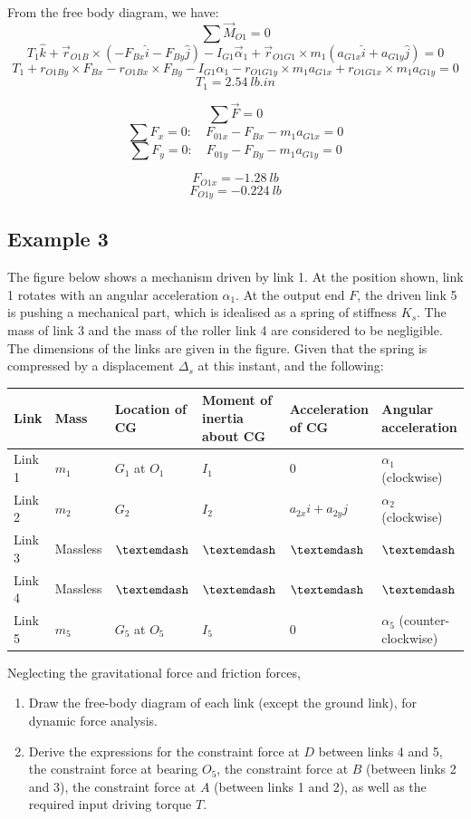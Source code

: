 \documentclass[11pt]{article}
\begin{document}
From the free body diagram, we have:
\[\sum \vec{M}_{O1} = 0\]
\[T_1 \hat{k} + \vec{r}_{O1B} \times (- F_{Bx} \hat{i} - F_{By} \hat{j}) - I_{G1} \vec{\alpha}_1 + \vec{r}_{O1G1} \times m_1 (a_{G1x} \hat{i} + a_{G1y} \hat{j}) = 0\]
\[T_1 + r_{O1By} \times F_{Bx} - r_{O1Bx} \times F_{By} - I_{G1} \alpha_1 - r_{O1G1y} \times m_1 a_{G1x} + r_{O1G1x} \times m_1 a_{G1y} = 0\]
\[T_1 = \qty{2.54}{lb.in}\]

\[\sum \vec{F} = 0\]
\[\sum F_x = 0: \quad F_{01x} - F_{Bx} - m_1 a_{G1x} = 0\]
\[\sum F_y = 0: \quad F_{01y} - F_{By} - m_1 a_{G1y} = 0\]

\[F_{O1x} = \qty{-1.28}{lb}\]
\[F_{O1y} = \qty{-0.224}{lb}\]
\subsection{Example 3}
\label{sec:orgc01845b}
The figure below shows a mechanism driven by link 1. At the position shown, link 1 rotates with an angular acceleration \(\alpha_1\). At the output end \(F\), the driven link 5 is pushing a mechanical part, which is idealised as a spring of stiffness \(K_s\). The mass of link 3 and the mass of the roller link 4 are considered to be negligible. The dimensions of the links are given in the figure. Given that the spring is compressed by a displacement \(\Delta_s\) at this instant, and the following:
\begin{center}
\begin{tabularx}{1.2\textwidth}{|X|X|X|X|X|X|}
\hline
Link & Mass & Location of CG & Moment of inertia about CG & Acceleration of CG & Angular acceleration\\
\hline
Link 1 & \(m_1\) & \(G_1\) at \(O_1\) & \(I_1\) & 0 & \(\alpha_1\) (clockwise)\\
\hline
Link 2 & \(m_2\) & \(G_2\) & \(I_2\) & \(a_{2x} i + a_{2y} j\) & \(\alpha_2\) (clockwise)\\
\hline
Link 3 & Massless & \(\textemdash\) & \(\textemdash\) & \(\textemdash\) & \(\textemdash\)\\
\hline
Link 4 & Massless & \(\textemdash\) & \(\textemdash\) & \(\textemdash\) & \(\textemdash\)\\
\hline
Link 5 & \(m_5\) & \(G_5\) at \(O_5\) & \(I_5\) & 0 & \(\alpha_5\) (counter-clockwise)\\
\hline
\end{tabularx}
\end{center}

Neglecting the gravitational force and friction forces,
\begin{enumerate}
\item Draw the free-body diagram of each link (except the ground link), for dynamic force analysis.
\item Derive the expressions for the constraint force at \(D\) between links 4 and 5, the constraint force at bearing \(O_5\), the constraint force at \(B\) (between links 2 and 3), the constraint force at \(A\) (between links 1 and 2), as well as the required input driving torque \(T\).
\end{enumerate}
\end{document}
